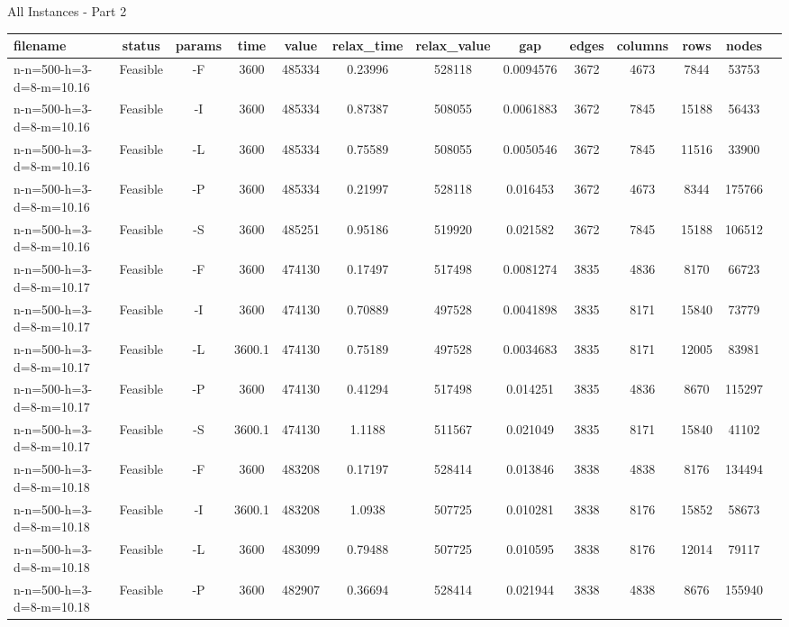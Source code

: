 \documentclass[landscape, a4paper]{article}
\begin{document}
\begin{center}
All Instances - Part 2

\begin{tabular}{lcccccccccccc}
filename & status & params & time & value & relax\_time & relax\_value & gap & edges & columns & rows & nodes & \\
\hline
n-n=500-h=3-d=8-m=10.16 & Feasible & -F & 3600 & 485334 & 0.23996 & 528118 & 0.0094576 & 3672 & 4673 & 7844 & 53753 & \\
n-n=500-h=3-d=8-m=10.16 & Feasible & -I & 3600 & 485334 & 0.87387 & 508055 & 0.0061883 & 3672 & 7845 & 15188 & 56433 & \\
n-n=500-h=3-d=8-m=10.16 & Feasible & -L & 3600 & 485334 & 0.75589 & 508055 & 0.0050546 & 3672 & 7845 & 11516 & 33900 & \\
n-n=500-h=3-d=8-m=10.16 & Feasible & -P & 3600 & 485334 & 0.21997 & 528118 & 0.016453 & 3672 & 4673 & 8344 & 175766 & \\
n-n=500-h=3-d=8-m=10.16 & Feasible & -S & 3600 & 485251 & 0.95186 & 519920 & 0.021582 & 3672 & 7845 & 15188 & 106512 & \\
n-n=500-h=3-d=8-m=10.17 & Feasible & -F & 3600 & 474130 & 0.17497 & 517498 & 0.0081274 & 3835 & 4836 & 8170 & 66723 & \\
n-n=500-h=3-d=8-m=10.17 & Feasible & -I & 3600 & 474130 & 0.70889 & 497528 & 0.0041898 & 3835 & 8171 & 15840 & 73779 & \\
n-n=500-h=3-d=8-m=10.17 & Feasible & -L & 3600.1 & 474130 & 0.75189 & 497528 & 0.0034683 & 3835 & 8171 & 12005 & 83981 & \\
n-n=500-h=3-d=8-m=10.17 & Feasible & -P & 3600 & 474130 & 0.41294 & 517498 & 0.014251 & 3835 & 4836 & 8670 & 115297 & \\
n-n=500-h=3-d=8-m=10.17 & Feasible & -S & 3600.1 & 474130 & 1.1188 & 511567 & 0.021049 & 3835 & 8171 & 15840 & 41102 & \\
n-n=500-h=3-d=8-m=10.18 & Feasible & -F & 3600 & 483208 & 0.17197 & 528414 & 0.013846 & 3838 & 4838 & 8176 & 134494 & \\
n-n=500-h=3-d=8-m=10.18 & Feasible & -I & 3600.1 & 483208 & 1.0938 & 507725 & 0.010281 & 3838 & 8176 & 15852 & 58673 & \\
n-n=500-h=3-d=8-m=10.18 & Feasible & -L & 3600 & 483099 & 0.79488 & 507725 & 0.010595 & 3838 & 8176 & 12014 & 79117 & \\
n-n=500-h=3-d=8-m=10.18 & Feasible & -P & 3600 & 482907 & 0.36694 & 528414 & 0.021944 & 3838 & 4838 & 8676 & 155940 & \\

\end{tabular}
\end{center}
\end{document}
